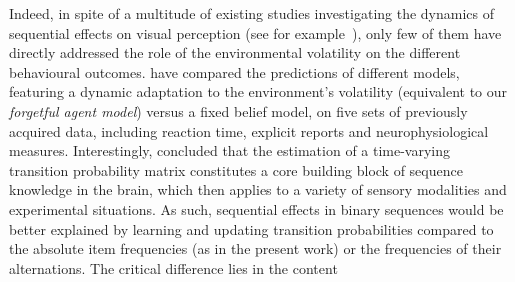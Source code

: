 \documentclass[12pt,english]{article}%
\newcommand{\citep}[1]{\parencite{#1}}
\newcommand{\citet}[1]{\textcite{#1}}
\begin{document}
Indeed, in spite of a multitude of existing studies investigating the dynamics of sequential effects on visual perception (see for example~\citet{Cicchini_PRSB_2018,ChopinMamassian2012}), only few of them have directly addressed the role of the environmental volatility on the different behavioural outcomes. \citet{Meyniel16} have compared the predictions of different models, featuring a dynamic adaptation to the environment's volatility (equivalent to our \textit{forgetful agent model}) versus a fixed belief model, on five sets of previously acquired data, including reaction time, explicit reports and neurophysiological measures.  Interestingly, \citet{Meyniel16} concluded that the estimation of a time-varying transition probability matrix constitutes
a core building block of sequence knowledge in the brain,
which then applies to a variety of sensory modalities and
experimental situations.
As such, sequential effects in binary sequences would be better explained
by learning and updating transition probabilities
compared to the absolute item frequencies (as in the present work) or the frequencies of their alternations.
The critical difference lies in the content
\end{document}
